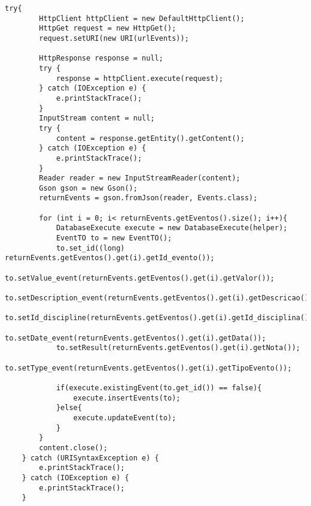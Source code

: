 \begin{lstlisting}[style=custom_JAVA]
try{
        HttpClient httpClient = new DefaultHttpClient();
        HttpGet request = new HttpGet();
        request.setURI(new URI(urlEvents));

        HttpResponse response = null;
        try {
            response = httpClient.execute(request);
        } catch (IOException e) {
            e.printStackTrace();
        }
        InputStream content = null;
        try {
            content = response.getEntity().getContent();
        } catch (IOException e) {
            e.printStackTrace();
        }
        Reader reader = new InputStreamReader(content);
        Gson gson = new Gson();
        returnEvents = gson.fromJson(reader, Events.class);

        for (int i = 0; i< returnEvents.getEventos().size(); i++){
            DatabaseExecute execute = new DatabaseExecute(helper);
            EventTO to = new EventTO();
            to.set_id((long) returnEvents.getEventos().get(i).getId_evento());
            to.setValue_event(returnEvents.getEventos().get(i).getValor());
            to.setDescription_event(returnEvents.getEventos().get(i).getDescricao());
            to.setId_discipline(returnEvents.getEventos().get(i).getId_disciplina());
            to.setDate_event(returnEvents.getEventos().get(i).getData());
            to.setResult(returnEvents.getEventos().get(i).getNota());
            to.setType_event(returnEvents.getEventos().get(i).getTipoEvento());

            if(execute.existingEvent(to.get_id()) == false){
                execute.insertEvents(to);
            }else{
                execute.updateEvent(to);
            }
        }
        content.close();
    } catch (URISyntaxException e) {
        e.printStackTrace();
    } catch (IOException e) {
        e.printStackTrace();
    }
\end{lstlisting}